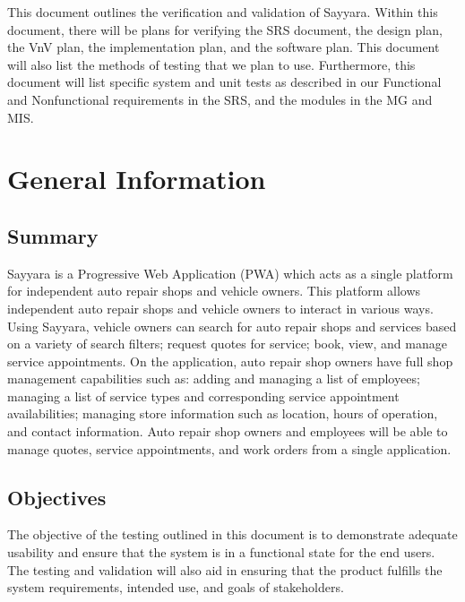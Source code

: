 \documentclass[12pt, titlepage]{article}
\begin{document}
\newpage


This document outlines the verification and validation of Sayyara. Within this document, there will
be plans for verifying the SRS document, the design plan, the VnV plan, the implementation plan,
and the software plan. This document will also list the methods of testing that we plan to use.
Furthermore, this document will list specific system and unit tests as described in our Functional
and Nonfunctional requirements in the SRS, and the modules in the MG and MIS.

\section{General Information}

\subsection{Summary}

Sayyara is a Progressive Web Application (PWA) which acts as a single platform for independent auto
repair shops and vehicle owners. This platform allows independent auto repair shops and vehicle
owners to interact in various ways. Using Sayyara, vehicle owners can search for auto repair shops
and services based on a variety of search filters; request quotes for service; book, view, and
manage service appointments. On the application, auto repair shop owners have full shop management
capabilities such as: adding and managing a list of employees; managing a list of service types and
corresponding service appointment availabilities; managing store information such as location,
hours of operation, and contact information. Auto repair shop owners and employees will be able to
manage quotes, service appointments, and work orders from a single application.

\subsection{Objectives}

The objective of the testing outlined in this document is to demonstrate adequate usability and
ensure that the system is in a functional state for the end users. The testing and validation will
also aid in ensuring that the product fulfills the system requirements, intended use, and goals of
stakeholders.
\end{document}
